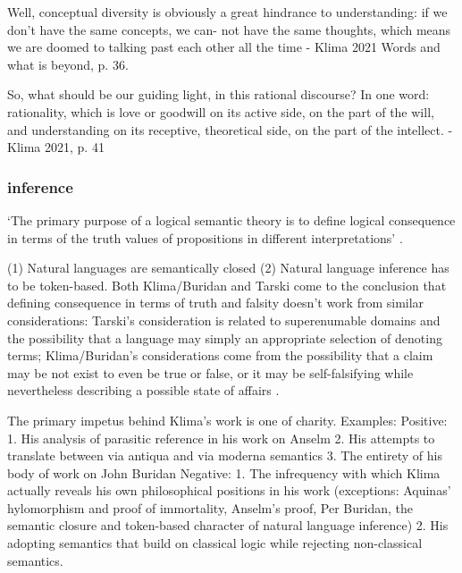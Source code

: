 \documentclass[]{article}
\begin{document}

Well, conceptual diversity is obviously
a great hindrance to understanding: if we don’t have the same concepts, we can-
not have the same thoughts, which means we are doomed to talking past each
other all the time - Klima 2021 Words and what is beyond, p. 36.

So, what should be our guiding light, in this rational discourse? In one word:
rationality, which is love or goodwill on its active side, on the part of the will, and
understanding on its receptive, theoretical side, on the part of the intellect. -Klima 2021, p. 41
\autocite{Parsons2014,Read2015b}

\subsubsection{inference}


`The primary purpose of a logical semantic theory is to define logical consequence in terms of the truth values of propositions in different interpretations' \autocite[79]{Klima1991b}. 

(1) Natural languages are semantically closed (2) Natural language inference has to be token-based.
Both Klima/Buridan and Tarski come to the conclusion that defining consequence in terms of truth and falsity doesn't work from similar considerations: Tarski's consideration is related to superenumable domains and the possibility that a language may simply an appropriate selection of denoting terms; Klima/Buridan's considerations come from the possibility that a claim may be not exist to even be true or false, or it may be self-falsifying while nevertheless describing a possible state of affairs \autocite[96]{Klima2004}.

The primary impetus behind Klima's work is one of charity.
Examples: 
Positive:
1. His analysis of parasitic reference in his work on Anselm
2. His attempts to translate between via antiqua and via moderna semantics
3. The entirety of his body of work on John Buridan
Negative:
1. The infrequency with which Klima actually reveals his own philosophical positions in his work (exceptions: 
Aquinas' hylomorphism and proof of immortality, 
Anselm's proof, 
Per Buridan, the semantic closure and token-based character of natural language inference)
2. His adopting semantics that build on classical logic while rejecting non-classical semantics.
\end{document}
